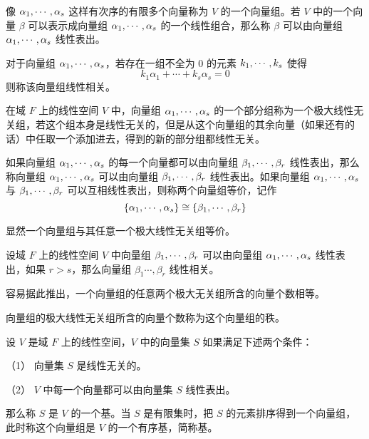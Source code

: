 像 $\alpha_1,\cdots,\alpha_s$ 这样有次序的有限多个向量称为 $V$ 的一个向量组。若 $V$ 中的一个向量 $\beta$ 可以表示成向量组 $\alpha_1,\cdots,\alpha_s$ 的一个线性组合，那么称 $\beta$ 可以由向量组 $\alpha_1,\cdots,\alpha_s$ 线性表出。

\begin{definition}[线性相关]
    对于向量组 $\alpha_1,\cdots,\alpha_s$，若存在一组不全为 $0$ 的元素 $k_1,\cdots,k_s$ 使得
    \[ k_1\alpha_1 + \cdots + k_s\alpha_s = 0 \]
    则称该向量组线性相关。
\end{definition}

\begin{definition}
    在域 $F$ 上的线性空间 $V$ 中，向量组 $\alpha_1,\cdots,\alpha_s$ 的一个部分组称为一个极大线性无关组，若这个组本身是线性无关的，但是从这个向量组的其余向量（如果还有的话）中任取一个添加进去，得到的新的部分组都线性无关。
\end{definition}

\begin{definition}
    如果向量组 $\alpha_1,\cdots,\alpha_s$ 的每一个向量都可以由向量组 $\beta_1,\cdots,\beta_r$ 线性表出，那么称向量组 $\alpha_1,\cdots,\alpha_s$ 可以由向量组 $\beta_1,\cdots,\beta_r$ 线性表出。如果向量组 $\alpha_1,\cdots,\alpha_s$ 与 $\beta_1,\cdots,\beta_r$ 可以互相线性表出，则称两个向量组等价，记作
    \[ \{ \alpha_1, \cdots,\alpha_s \} \cong \{\beta_1,\cdots,\beta_r\}\]
\end{definition}

显然一个向量组与其任意一个极大线性无关组等价。

\begin{theorem}
    设域 $F$ 上的线性空间 $V$ 中向量组 $\beta_1,\cdots,\beta_r$ 可以由向量组 $\alpha_1,\cdots,\alpha_s$ 线性表出，如果 $r>s$，那么向量组 $\beta_1\cdots,\beta_r$ 线性相关。
\end{theorem}

容易据此推出，一个向量组的任意两个极大无关组所含的向量个数相等。

\begin{definition}
    向量组的极大线性无关组所含的向量个数称为这个向量组的秩。
\end{definition}

\begin{definition}
    设 $V$ 是域 $F$ 上的线性空间，$V$ 中的向量集 $S$ 如果满足下述两个条件：

    （1） 向量集 $S$ 是线性无关的。

    （2） $V$ 中每一个向量都可以由向量集 $S$ 线性表出。

    那么称 $S$ 是 $V$ 的一个基。当 $S$ 是有限集时，把 $S$ 的元素排序得到一个向量组，此时称这个向量组是 $V$ 的一个有序基，简称基。
\end{definition}

